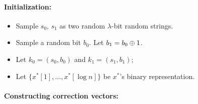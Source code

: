 \begin{figure}
    
    \begin{minipage}{\textwidth}
        \begin{mdframed}
            \paragraph{Initialization:} 
            \begin{itemize}
                \item Sample $s_0$, $s_1$ as two random $\lambda$-bit random strings. 
                \item Sample a random bit $b_0$. Let $b_1=b_0\oplus 1$.
                \item Let $k_0 = (s_0, b_0)$ and $k_1=(s_1,b_1)$;
                \item Let $\{x^*[1],\dots,x^*[\log n]\}$ be $x^*$'s binary representation. 
            \end{itemize}
            
            
            \paragraph{Constructing correction vectors:} 
            

\end{mdframed}
\end{minipage}
\end{figure}
